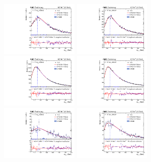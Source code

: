 \begin{figure}
	\begin{center}
        \includegraphics[width=0.33\textwidth]{fig/turnon_comparison/over_cat1_prefit_new.pdf}
        \includegraphics[width=0.33\textwidth]{fig/turnon_comparison/over_cat2_prefit_new.pdf}\\
        \includegraphics[width=0.33\textwidth]{fig/turnon_comparison/plot_cat3_prefit_new.pdf}
        \includegraphics[width=0.33\textwidth]{fig/turnon_comparison/plot_cat4_prefit_new.pdf}\\
        \includegraphics[width=0.33\textwidth]{fig/turnon_comparison/over_cat501_prefit_new.pdf}
        \includegraphics[width=0.33\textwidth]{fig/turnon_comparison/over_cat502_prefit_new.pdf}\\

\end{center}
\end{figure}
